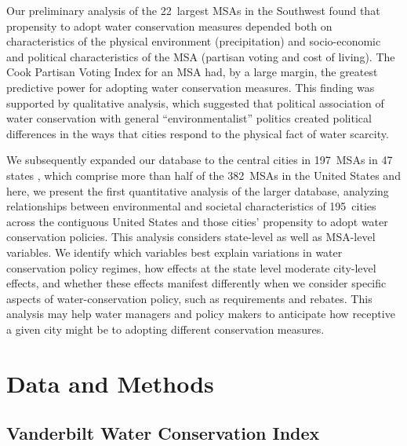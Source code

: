 \documentclass[draft,linenumbers]{agujournal}\usepackage{knitr}
\begin{document}
Our preliminary analysis of the 22~largest MSAs in the Southwest found that propensity to adopt water conservation measures depended both on characteristics of the physical environment (precipitation) and socio-economic and political characteristics of the MSA (partisan voting and cost of living). The Cook Partisan Voting Index for an MSA had, by a large margin, the greatest predictive power for adopting water conservation measures. This finding was supported by qualitative analysis, which suggested that political association of water conservation with general ``environmentalist'' politics created political differences in the ways that cities respond to the physical fact of water scarcity.

We subsequently expanded our database to the central cities in 197~MSAs in 47 states \citep{hess_vwci_2017}, which comprise more than half of the 382~MSAs in the United States \citep{census_population_2015} and here, we present the first quantitative analysis of the larger database, analyzing relationships between environmental and societal characteristics of 195~cities across the contiguous United States and those cities' propensity to adopt water conservation policies. This analysis considers state-level as well as MSA-level variables. We identify which variables best explain variations in water conservation policy regimes, how effects at the state level moderate city-level effects, and whether these effects manifest differently when we consider specific aspects of water-conservation policy, such as requirements and rebates.
This analysis may help water managers and policy makers to anticipate how receptive a given city might be to adopting different conservation measures.

\section{Data and Methods}
\label{sec:data.methods}
\subsection{Vanderbilt Water Conservation Index}
%
%
\end{document}
